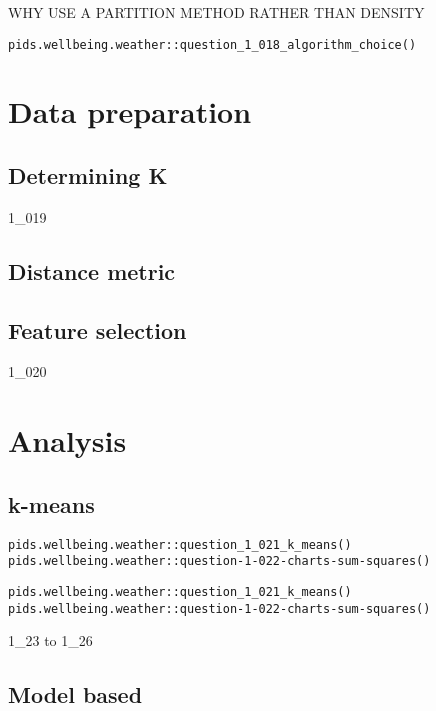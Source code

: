 \documentclass[12pt, oneside, openany]{book}
\begin{document}
WHY USE A PARTITION METHOD RATHER THAN DENSITY

\begin{verbatim}
pids.wellbeing.weather::question_1_018_algorithm_choice()
\end{verbatim}

\section*{Data preparation}

\subsection*{Determining K}

1_019

\subsection*{Distance metric}

\subsection*{Feature selection}

1_020

\section*{Analysis}

\subsection*{k-means}

\begin{verbatim}
pids.wellbeing.weather::question_1_021_k_means()
pids.wellbeing.weather::question-1-022-charts-sum-squares()
\end{verbatim}

\begin{verbatim}
pids.wellbeing.weather::question_1_021_k_means()
pids.wellbeing.weather::question-1-022-charts-sum-squares()
\end{verbatim}

1_23 to 1_26
\subsection*{Model based}
\end{document}
